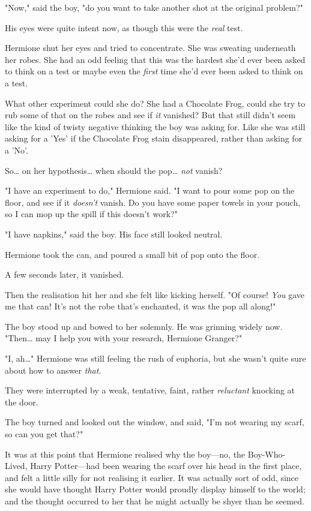 "Now," said the boy, "do you want to take another shot at the original problem?"

His eyes were quite intent now, as though this were the \emph{real} test.

Hermione shut her eyes and tried to concentrate. She was sweating underneath her robes. She had an odd feeling that this was the hardest she'd ever been asked to think on a test or maybe even the \emph{first} time she'd ever been asked to think on a test.

What other experiment could she do? She had a Chocolate Frog, could she try to rub some of that on the robes and see if \emph{it} vanished? But that still didn't seem like the kind of twisty negative thinking the boy was asking for. Like she was still asking for a 'Yes' if the Chocolate Frog stain disappeared, rather than asking for a 'No'.

So{\ldots} on her hypothesis{\ldots} when should the pop{\ldots} \emph{not} vanish?

"I have an experiment to do," Hermione said. "I want to pour some pop on the floor, and see if it \emph{doesn't} vanish. Do you have some paper towels in your pouch, so I can mop up the spill if this doesn't work?"

"I have napkins," said the boy. His face still looked neutral.

Hermione took the can, and poured a small bit of pop onto the floor.

A few seconds later, it vanished.

Then the realisation hit her and she felt like kicking herself. "Of course! \emph{You} gave me that can! It's not the robe that's enchanted, it was the pop all along!"

The boy stood up and bowed to her solemnly. He was grinning widely now. "Then{\ldots} may I help you with your research, Hermione Granger?"

"I, ah{\ldots}" Hermione was still feeling the rush of euphoria, but she wasn't quite sure about how to answer \emph{that.}

They were interrupted by a weak, tentative, faint, rather \emph{reluctant} knocking at the door.

The boy turned and looked out the window, and said, "I'm not wearing my scarf, so can you get that?"

It was at this point that Hermione realised why the boy---no, the Boy-Who-Lived, Harry Potter---had been wearing the scarf over his head in the first place, and felt a little silly for not realising it earlier. It was actually sort of odd, since she would have thought Harry Potter would proudly display himself to the world; and the thought occurred to her that he might actually be shyer than he seemed.

